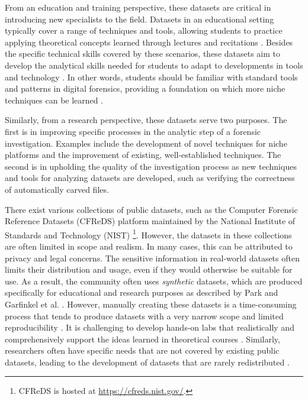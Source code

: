 From an education and training perspective, these datasets are critical
in introducing new specialists to the field. Datasets in an educational
setting typically cover a range of techniques and tools, allowing
students to practice applying theoretical concepts learned through
lectures and recitations
\citep{adelsteinAutomaticallyCreatingRealistic2005}. Besides the
specific technical skills covered by these scenarios, these datasets aim
to develop the analytical skills needed for students to adapt to
developments in tools and technology
\citep{cooperStandardsDigitalForensics2010}. In other words, students
should be familiar with standard tools and patterns in digital
forensics, providing a foundation on which more niche techniques can be
learned \citep{lawrenceFrameworkDesignWebbased2009}.

Similarly, from a research perspective, these datasets serve two
purposes. The first is in improving specific processes in the analytic
step of a forensic investigation. Examples include the development of
novel techniques for niche platforms and the improvement of existing,
well-established techniques. The second is in upholding the quality of
the investigation process as new techniques and tools for analyzing
datasets are developed, such as verifying the correctness of
automatically carved files.

There exist various collections of public datasets, such as the Computer
Forensic Reference Datasets (CFReDS) platform maintained by the National
Institute of Standards and Technology (NIST) \footnote{CFReDS is hosted
  at \url{https://cfreds.nist.gov/}.}. However, the datasets in these
collections are often limited in scope and realism. In many cases, this
can be attributed to privacy and legal concerns. The sensitive
information in real-world datasets often limits their distribution and
usage, even if they would otherwise be suitable for use. As a result,
the community often uses \emph{synthetic} datasets, which are produced
specifically for educational and research purposes as described by Park
and Garfinkel et al.
\citep{parkTREDEVMPOPCultivating2018,garfinkelBringingScienceDigital2009}.
However, manually creating these datasets is a time-consuming process
that tends to produce datasets with a very narrow scope and limited
reproducibility
\citep{garfinkelBringingScienceDigital2009,grajedaAvailabilityDatasetsDigital2017}.
It is challenging to develop hands-on labs that realistically and
comprehensively support the ideas learned in theoretical courses
\citep{adelsteinAutomaticallyCreatingRealistic2005,guptaDigitalForensicsLab2022,lawrenceFrameworkDesignWebbased2009}.
Similarly, researchers often have specific needs that are not covered by
existing public datasets, leading to the development of datasets that
are rarely redistributed
\citep{grajedaAvailabilityDatasetsDigital2017}.

